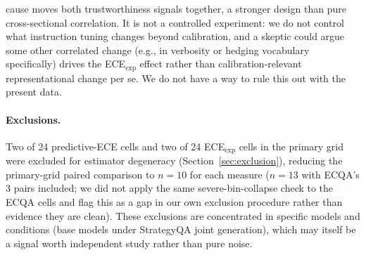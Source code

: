 \documentclass[letterpaper]{article} %
\begin{document}
cause moves both trustworthiness signals together, a stronger design than pure cross-sectional correlation. It is not a controlled experiment: we do not control what instruction tuning changes beyond calibration, and a skeptic could argue some other correlated change (e.g., in verbosity or hedging vocabulary specifically) drives the ECE$_{\text{exp}}$ effect rather than calibration-relevant representational change per se. We do not have a way to rule this out with the present data. \paragraph{Exclusions.} Two of 24 predictive-ECE cells and two of 24 ECE$_{\text{exp}}$ cells in the primary grid were excluded for estimator degeneracy (Section~\ref{sec:exclusion}), reducing the primary-grid paired comparison to $n{=}10$ for each measure ($n{=}13$ with ECQA's 3 pairs included; we did not apply the same severe-bin-collapse check to the ECQA cells and flag this as a gap in our own exclusion procedure rather than evidence they are clean). These exclusions are concentrated in specific models and conditions (base models under StrategyQA joint generation), which may itself be a signal worth independent study rather than pure noise. 
\end{document}
